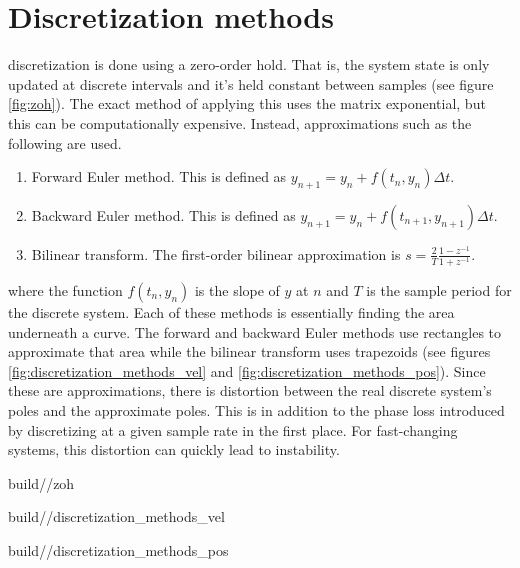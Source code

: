 \section{Discretization methods}

\Gls{discretization} is done using a zero-order hold. That is, the \gls{system}
\gls{state} is only updated at discrete intervals and it's held constant between
samples (see figure \ref{fig:zoh}). The exact method of applying this uses the
matrix exponential, but this can be computationally expensive. Instead,
approximations such as the following are used.
\begin{enumerate}
  \item Forward Euler method. This is defined as
    $y_{n+1} = y_n + f(t_n, y_n) \Delta t$.
  \item Backward Euler method. This is defined as
    $y_{n+1} = y_n + f(t_{n+1}, y_{n+1}) \Delta t$.
  \item Bilinear transform. The first-order bilinear approximation is
    $s = \frac{2}{T} \frac{1 - z^{-1}}{1 + z^{-1}}$.
\end{enumerate}

where the function $f(t_n, y_n)$ is the slope of $y$ at $n$ and $T$ is the
sample period for the discrete \gls{system}. Each of these methods is
essentially finding the area underneath a curve. The forward and backward Euler
methods use rectangles to approximate that area while the bilinear transform
uses trapezoids (see figures \ref{fig:discretization_methods_vel} and
\ref{fig:discretization_methods_pos}). Since these are approximations, there is
distortion between the real discrete \gls{system}'s poles and the approximate
poles. This is in addition to the phase loss introduced by discretizing at a
given sample rate in the first place. For fast-changing \glspl{system}, this
distortion can quickly lead to instability.
\begin{bookfigure}
  \begin{minisvg}{2}{build/\chapterpath/zoh}
      \caption{Zero-order hold of a system response}
      \label{fig:zoh}
  \end{minisvg}
  \hfill
  \begin{minisvg}{2}{build/\chapterpath/discretization_methods_vel}
    \caption{Discretization methods applied to velocity data}
    \label{fig:discretization_methods_vel}
  \end{minisvg}
  \hfill
  \begin{minisvg}{2}{build/\chapterpath/discretization_methods_pos}
    \caption{Position plot of discretization methods applied to velocity data}
    \label{fig:discretization_methods_pos}
  \end{minisvg}
\end{bookfigure}
